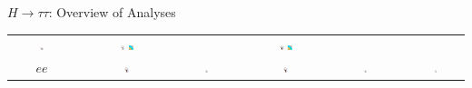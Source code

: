 \documentclass{beamer}
\begin{document}
\begin{frame}{$H \rightarrow \tau \tau$: Overview of Analyses}
\begin{table}
\begin{tabular}{c | c | c | c | c | c | c}
			\includegraphics[width=0.05\textwidth]{figures/atlas_logo.pdf} &
			\includegraphics[width=0.05\textwidth]{figures/atlas_logo.pdf} \includegraphics[width=0.05\textwidth]{figures/cms_logo.pdf} &
			&
			\includegraphics[width=0.05\textwidth]{figures/atlas_logo.pdf} \includegraphics[width=0.05\textwidth]{figures/cms_logo.pdf} 	
			\\
			$ee$ &
			\includegraphics[width=0.05\textwidth]{figures/atlas_logo.pdf} &
			\includegraphics[width=0.05\textwidth]{figures/atlas_logo.pdf} &
			\includegraphics[width=0.05\textwidth]{figures/atlas_logo.pdf} &
			\includegraphics[width=0.05\textwidth]{figures/atlas_logo.pdf} &
			&
			\includegraphics[width=0.05\textwidth]{figures/atlas_logo.pdf} 	
			\\	



\end{tabular}
\end{table}
\end{frame}
\end{document}
